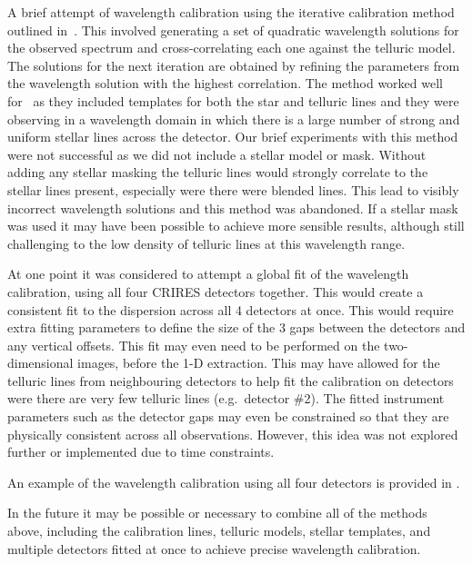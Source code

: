 A brief attempt of wavelength calibration using the iterative calibration method outlined in~\cite{brogi_rotation_2016}. This involved generating a set of quadratic wavelength solutions for the observed spectrum and cross-correlating each one against the telluric model. The solutions for the next iteration are obtained by refining the parameters from the wavelength solution with the highest correlation. The method worked well for~\citet{brogi_rotation_2016} as they included templates for both the star and telluric lines and they were observing in a wavelength domain in which there is a large number of strong and uniform stellar  lines across the detector.
Our brief experiments with this method were not successful as we did not include a stellar model or mask. Without adding any stellar masking the telluric lines would strongly correlate to the stellar lines present, especially were there were blended lines. This lead to visibly incorrect wavelength solutions and this method was abandoned. If a stellar mask was used it may have been possible to achieve more sensible results, although still challenging to the low density of telluric lines at this wavelength range.


At one point it was considered to attempt a global fit of the wavelength calibration, using all four {CRIRES} detectors together. This would create a consistent fit to the dispersion across all 4 detectors at once. This would require extra fitting parameters to define the size of the 3 gaps between the detectors and any vertical offsets. This fit may even need to be performed on the two-dimensional images, before the 1-D extraction. This may have allowed for the telluric lines from neighbouring detectors to help fit the calibration on detectors were there are very few telluric lines (e.g.\ detector \#2). The fitted instrument parameters such as the detector gaps may even be constrained so that they are physically consistent across all observations. However, this idea was not explored further or implemented due to time constraints.


An example of the wavelength calibration using all four detectors is provided in .

In the future it may be possible or necessary to combine all of the methods above, including the \thar{} calibration lines, telluric models, stellar templates, and multiple detectors fitted at once to achieve precise wavelength calibration.

